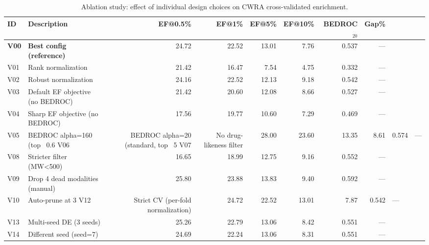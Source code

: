 \begin{table}[htbp]
\centering
\caption{Ablation study: effect of individual design choices on CWRA cross-validated enrichment.}
\label{tab:ablation}
\small
\begin{tabular}{ll rrrr rr}
\toprule
ID & Description & EF@0.5\% & EF@1\% & EF@5\% & EF@10\% & BEDROC$_{20}$ & Gap\% \\
\midrule
  \textbf{V00} & \textbf{Best config (reference)} & 24.72 & 22.52 & 13.01 & 7.76 & 0.537 & — \\
\addlinespace
  V01 & Rank normalization & 21.42 & 16.47 & 7.54 & 4.75 & 0.332 & — \\
  V02 & Robust normalization & 24.16 & 22.52 & 12.13 & 9.18 & 0.542 & — \\
\addlinespace
  V03 & Default EF objective (no BEDROC) & 21.42 & 20.60 & 12.08 & 8.66 & 0.527 & — \\
  V04 & Sharp EF objective (no BEDROC) & 17.56 & 19.77 & 10.60 & 7.29 & 0.469 & — \\
  V05 & BEDROC alpha=160 (top ~0.6%
  V06 & BEDROC alpha=20 (standard, top ~5%
\addlinespace
  V07 & No drug-likeness filter & 28.00 & 23.60 & 13.35 & 8.61 & 0.574 & — \\
  V08 & Stricter filter (MW<500) & 16.65 & 18.99 & 12.75 & 9.16 & 0.552 & — \\
\addlinespace
  V09 & Drop 4 dead modalities (manual) & 25.80 & 23.88 & 13.83 & 9.40 & 0.592 & — \\
  V10 & Auto-prune at 3%
\addlinespace
  V12 & Strict CV (per-fold normalization) & 24.72 & 22.52 & 13.01 & 7.87 & 0.542 & — \\
  V13 & Multi-seed DE (3 seeds) & 25.26 & 22.79 & 13.06 & 8.42 & 0.551 & — \\
  V14 & Different seed (seed=7) & 24.69 & 22.24 & 13.06 & 8.31 & 0.551 & — \\
\bottomrule
\end{tabular}
\end{table}